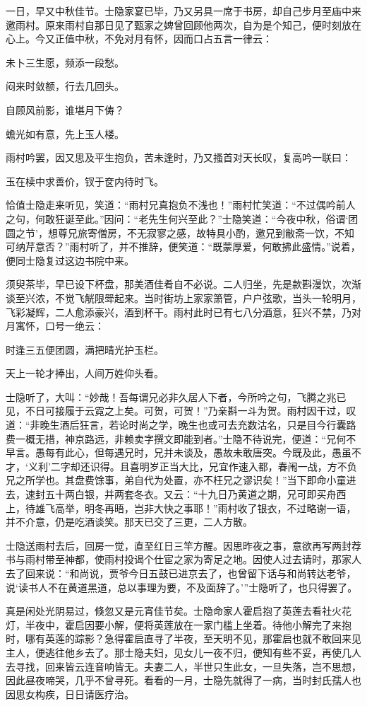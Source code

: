 一日，早又中秋佳节。士隐家宴已毕，乃又另具一席于书房，却自己步月至庙中来邀雨村。原来雨村自那日见了甄家之婢曾回顾他两次，自为是个知己，便时刻放在心上。今又正值中秋，不免对月有怀，因而口占五言一律云：

未卜三生愿，频添一段愁。

闷来时敛额，行去几回头。

自顾风前影，谁堪月下俦？

蟾光如有意，先上玉人楼。

雨村吟罢，因又思及平生抱负，苦未逢时，乃又搔首对天长叹，复高吟一联曰：

玉在椟中求善价，钗于奁内待时飞。

恰值士隐走来听见，笑道：“雨村兄真抱负不浅也！”雨村忙笑道：“不过偶吟前人之句，何敢狂诞至此。”因问：“老先生何兴至此？”士隐笑道：“今夜中秋，俗谓‘团圆之节’，想尊兄旅寄僧房，不无寂寥之感，故特具小酌，邀兄到敝斋一饮，不知可纳芹意否？”雨村听了，并不推辞，便笑道：“既蒙厚爱，何敢拂此盛情。”说着，便同士隐复过这边书院中来。

须臾茶毕，早已设下杯盘，那美酒佳肴自不必说。二人归坐，先是款斟漫饮，次渐谈至兴浓，不觉飞觥限斝起来。当时街坊上家家箫管，户户弦歌，当头一轮明月，飞彩凝辉，二人愈添豪兴，酒到杯干。雨村此时已有七八分酒意，狂兴不禁，乃对月寓怀，口号一绝云：

时逢三五便团圆，满把晴光护玉栏。

天上一轮才捧出，人间万姓仰头看。

士隐听了，大叫：“妙哉！吾每谓兄必非久居人下者，今所吟之句，飞腾之兆已见，不日可接履于云霓之上矣。可贺，可贺！”乃亲斟一斗为贺。雨村因干过，叹道：“非晚生酒后狂言，若论时尚之学，晚生也或可去充数沽名，只是目今行囊路费一概无措，神京路远，非赖卖字撰文即能到者。”士隐不待说完，便道：“兄何不早言。愚每有此心，但每遇兄时，兄并未谈及，愚故未敢唐突。今既及此，愚虽不才，‘义利’二字却还识得。且喜明岁正当大比，兄宜作速入都，春闱一战，方不负兄之所学也。其盘费馀事，弟自代为处置，亦不枉兄之谬识矣！”当下即命小童进去，速封五十两白银，并两套冬衣。又云：“十九日乃黄道之期，兄可即买舟西上，待雄飞高举，明冬再晤，岂非大快之事耶！”雨村收了银衣，不过略谢一语，并不介意，仍是吃酒谈笑。那天已交了三更，二人方散。

士隐送雨村去后，回房一觉，直至红日三竿方醒。因思昨夜之事，意欲再写两封荐书与雨村带至神都，使雨村投谒个仕宦之家为寄足之地。因使人过去请时，那家人去了回来说：“和尚说，贾爷今日五鼓已进京去了，也曾留下话与和尚转达老爷，说‘读书人不在黄道黑道，总以事理为要，不及面辞了。’”士隐听了，也只得罢了。

真是闲处光阴易过，倏忽又是元宵佳节矣。士隐命家人霍启抱了英莲去看社火花灯，半夜中，霍启因要小解，便将英莲放在一家门槛上坐着。待他小解完了来抱时，哪有英莲的踪影？急得霍启直寻了半夜，至天明不见，那霍启也就不敢回来见主人，便逃往他乡去了。那士隐夫妇，见女儿一夜不归，便知有些不妥，再使几人去寻找，回来皆云连音响皆无。夫妻二人，半世只生此女，一旦失落，岂不思想，因此昼夜啼哭，几乎不曾寻死。看看的一月，士隐先就得了一病，当时封氏孺人也因思女构疾，日日请医疗治。

